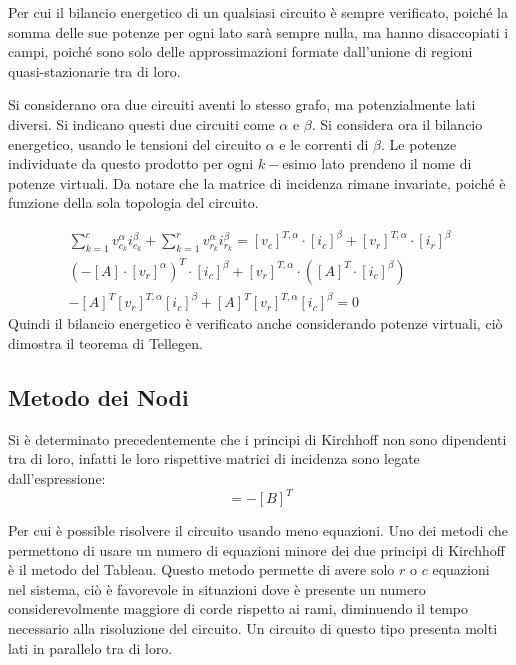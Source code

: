 \documentclass{article}
\numberwithin{equation}{subsection}
\begin{document}
Per cui il bilancio energetico di un qualsiasi circuito è sempre verificato, poiché la somma delle sue potenze per ogni lato sarà sempre nulla, ma hanno disaccopiati 
i campi, poiché sono solo delle approssimazioni formate dall'unione di regioni quasi-stazionarie tra di loro. 

Si considerano ora due circuiti aventi lo stesso grafo, ma potenzialmente lati diversi. Si indicano questi due circuiti come $\alpha$ e $\beta$. Si considera ora il 
bilancio energetico, usando le tensioni del circuito $\alpha$ e le correnti di $\beta$. Le potenze individuate da questo prodotto per ogni $k-$esimo lato prendeno il nome 
di potenze virtuali. Da notare che la matrice di incidenza rimane invariate, poiché è funzione della sola topologia del circuito. 

\begin{gather*}
    \displaystyle\sum_{k=1}^cv_{c_k}^\alpha i_{c_k}^\beta+\sum_{k=1}^rv_{r_k}^\alpha i_{r_k}^\beta=[v_c]^{T,\alpha}\cdot[i_c]^\beta+[v_r]^{T,\alpha}\cdot[i_r]^\beta\\
    \left(-[A]\cdot[v_r]^\alpha\right)^T\cdot[i_c]^\beta+[v_r]^{T,\alpha}\cdot\left([A]^T\cdot[i_c]^\beta\right)\\
    -[A]^T[v_r]^{T,\alpha}[i_c]^\beta+[A]^T[v_r]^{T,\alpha}[i_c]^\beta=0
\end{gather*}
Quindi il bilancio energetico è verificato anche considerando potenze virtuali, ciò dimostra il teorema di Tellegen. 

\subsection{Metodo dei Nodi}

Si è determinato precedentemente che i principi di Kirchhoff non sono dipendenti tra di loro, infatti le loro rispettive matrici di incidenza sono legate dall'espressione:
\begin{equation*}
    [A]=-[B]^T
\end{equation*}

Per cui è possible risolvere il circuito usando meno equazioni. Uno dei metodi che permettono di usare un numero di equazioni minore dei due principi di Kirchhoff è il metodo 
del Tableau. Questo metodo permette di avere solo $r$ o $c$ equazioni nel sistema, ciò è favorevole in situazioni dove è presente un numero considerevolmente maggiore di 
corde rispetto ai rami, diminuendo il tempo necessario alla risoluzione del circuito. Un circuito di questo tipo presenta molti lati in parallelo tra di loro. 
\end{document}
